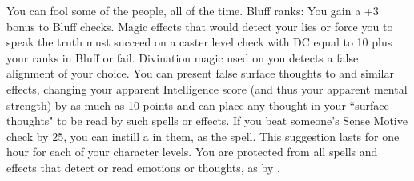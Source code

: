 \skillfeat
{You can fool some of the people, all of the time.}
{Bluff ranks:}
{You gain a +3 bonus to Bluff checks.}
{Magic effects that would detect your lies or force you to speak the truth must succeed on a caster level check with DC equal to 10 plus your ranks in Bluff or fail.}
{Divination magic used on you detects a false alignment of your choice. You can present false surface thoughts to  and similar effects, changing your apparent Intelligence score (and thus your apparent mental strength) by as much as 10 points and can place any thought in your ``surface thoughts" to be read by such spells or effects.}
{If you beat someone's Sense Motive check by 25, you can instill a  in them, as the spell. This suggestion lasts for one hour for each of your character levels.}
{You are protected from all spells and effects that detect or read emotions or thoughts, as by .}